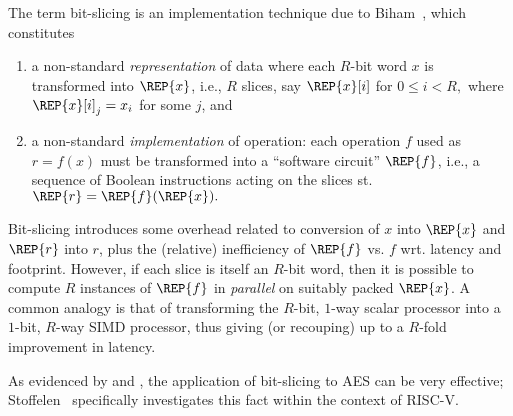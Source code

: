 The term bit-slicing is an implementation technique due to
Biham~\cite{Biham:97},
which constitutes

\begin{enumerate}
\item a non-standard {\em representation}
      of data where
      each $R$-bit word $x$ is transformed into $\REP{x}$,
      i.e.,
      $R$ slices, say $\REP{x}[ i ]$ for
      $
      0 \leq i < R ,
      $
      where $\REP{x}[ i ]_j = x_i$ for some $j$,
      and
\item a non-standard {\em implementation}
      of operation:
      each operation $f$ used as
      $
          {r} =     {f}(     {x} )
      $
      must be transformed into a ``software circuit'' $\REP{f}$,
      i.e.,
      a sequence of Boolean instructions acting on the slices st.
      $
      \REP{r} = \REP{f}( \REP{x} ) .
      $
\end{enumerate}

\noindent
Bit-slicing introduces some overhead related to conversion of $x$ into
$\REP{x}$ and $\REP{r}$ into $r$, plus the (relative) inefficiency
of $\REP{f}$ vs. $f$ wrt. latency and footprint.
However, if each slice is itself an $R$-bit word, then it
is possible to compute $R$ instances of $\REP{f}$ in {\em parallel}
on suitably packed $\REP{x}$.
A common analogy is that of transforming the 
$R$-bit, $1$-way scalar processor 
into a 
$1$-bit, $R$-way SIMD   processor, 
thus giving (or recouping) up to a $R$-fold improvement in latency.

As evidenced by \cite{MatNak:07,Konighofer:08} and \cite{KasSch:09},
the application of bit-slicing to AES can be very effective;
Stoffelen~\cite[Section 3.1]{Stoffelen:19}
specifically investigates this fact within the context of RISC-V.

